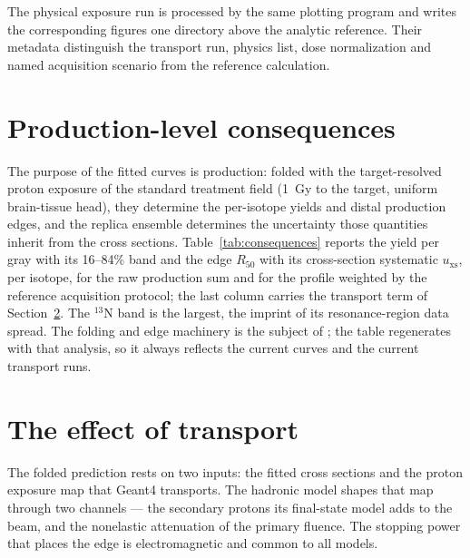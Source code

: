 \documentclass[11pt]{article}
\newcommand{\generateddir}{docs/generated/xsection_fit}
\newcommand{\generateddir}{generated/xsection_fit}
\begin{document}
The physical exposure run is processed by the same plotting program and writes
the corresponding figures one directory above the analytic reference.  Their
metadata distinguish the transport run, physics list, dose normalization and
named acquisition scenario from the reference calculation.

\section{Production-level consequences}

The purpose of the fitted curves is production: folded with the
target-resolved proton exposure of the standard treatment field
(\SI{1}{Gy} to the target, uniform brain-tissue head), they determine the
per-isotope yields and distal production edges, and the replica ensemble
determines the uncertainty those quantities inherit from the cross
sections.  Table~\ref{tab:consequences} reports the yield per gray with
its 16--84\% band and the edge $R_{50}$ with its cross-section systematic
$u_{\mathrm{xs}}$, per isotope, for the raw production sum and for the
profile weighted by the reference acquisition protocol; the last column
carries the transport term of Section~\ref{sec:transport-term}.  The
$^{13}$N band is the largest, the imprint of its resonance-region data
spread.  The folding and edge machinery is the subject of
; the table regenerates with that
analysis, so it always reflects the current curves and the current
transport runs.

\begin{table}[H]
\centering
\caption{Yields per gray and distal edges of the standard field, with the
uncertainties of the prediction: the 1000-replica cross-section fold
($u_{\mathrm{xs}}$) and the hadronic-transport term
($u_{\mathrm{transport}}$, Section~\ref{sec:transport-term}).}
\label{tab:consequences}

\end{table}

\section{The effect of transport}
\label{sec:transport-term}

The folded prediction rests on two inputs: the fitted cross sections and
the proton exposure map that Geant4 transports.  The hadronic model shapes
that map through two channels --- the secondary protons its final-state
model adds to the beam, and the nonelastic attenuation of the primary
fluence.  The stopping power that places the edge is electromagnetic and
common to all models.
\end{document}
